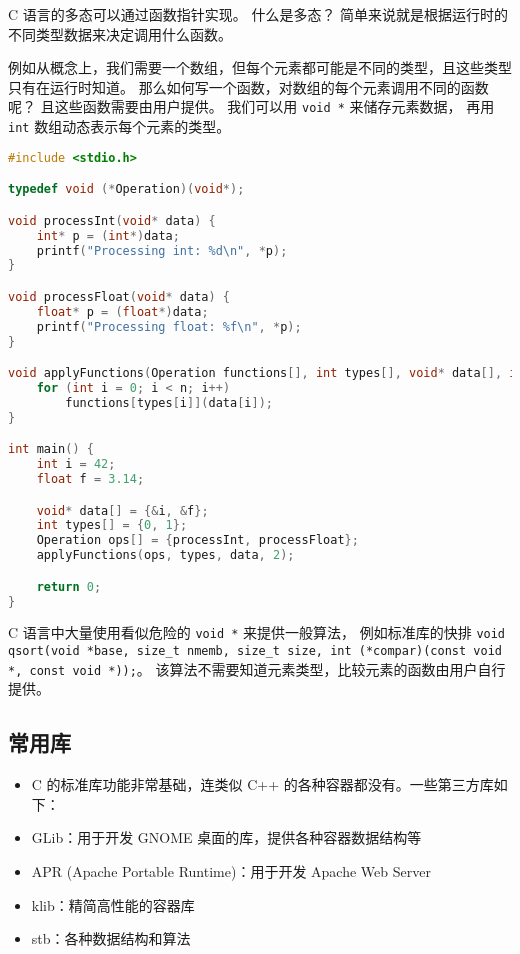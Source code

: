 

C 语言的多态可以通过函数指针实现。 什么是多态？ 简单来说就是根据运行时的不同类型数据来决定调用什么函数。

例如从概念上，我们需要一个数组，但每个元素都可能是不同的类型，且这些类型只有在运行时知道。 那么如何写一个函数，对数组的每个元素调用不同的函数呢？ 且这些函数需要由用户提供。 我们可以用 \verb`void *` 来储存元素数据， 再用 \verb`int` 数组动态表示每个元素的类型。

\begin{lstlisting}[language=cpp]
#include <stdio.h>

typedef void (*Operation)(void*);

void processInt(void* data) {
    int* p = (int*)data;
    printf("Processing int: %d\n", *p);
}

void processFloat(void* data) {
    float* p = (float*)data;
    printf("Processing float: %f\n", *p);
}

void applyFunctions(Operation functions[], int types[], void* data[], int n) {
    for (int i = 0; i < n; i++)
        functions[types[i]](data[i]);
}

int main() {
    int i = 42;
    float f = 3.14;

    void* data[] = {&i, &f};
    int types[] = {0, 1};
    Operation ops[] = {processInt, processFloat};
    applyFunctions(ops, types, data, 2);

    return 0;
}
\end{lstlisting}

C 语言中大量使用看似危险的 \verb`void *` 来提供一般算法， 例如标准库的快排 \verb`void qsort(void *base, size_t nmemb, size_t size, int (*compar)(const void *, const void *));`。 该算法不需要知道元素类型，比较元素的函数由用户自行提供。

\subsection{常用库}
\begin{itemize}
\item C 的标准库功能非常基础，连类似 C++ 的各种容器都没有。一些第三方库如下：
\item GLib：用于开发 GNOME 桌面的库，提供各种容器数据结构等
\item APR (Apache Portable Runtime)：用于开发 Apache Web Server
\item klib：精简高性能的容器库
\item stb：各种数据结构和算法
\end{itemize}
